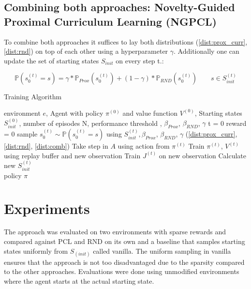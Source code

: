 \documentclass{article}
\begin{document}
\subsection{Combining both approaches: Novelty-Guided Proximal Curriculum Learning (NGPCL)}
\label{sec:comb}

To combine both approaches it suffices to lay both distributions (\cref{dist:prox_curr}, \cref{dist:rnd}) on top of each other using a hyperparameter $\gamma$. Additionally one can update the set of starting states $S_{init}$ on every step t.:

\begin{equation}\label{dist:comb}
  \mathbb{P}(s_0^{(t)} = s) = \gamma * \mathbb{P}_{Prox}(s_0^{(t)}) + (1 - \gamma) * \mathbb{P}_{RND}(s_0^{(t)}) \qquad s \in S_{init}^{(t)}
\end{equation}

\begin{algorithm}[H]
    \caption{Training Algorithm}
    \label{alg:code}
    \begin{algorithmic}
      \Require environment $e$, Agent with policy $\pi^{(0)}$ and value function $V^{(0)}$, Starting states $S_{init}^{(0)}$, number of episodes N, performance threshold \eta, $\beta_{Prox}$, $\beta_{RND}$, $\gamma$
        \State t = 0
        \State reward = 0
        \State sample $s_0^{(t)} \sim \mathbb{P}(s_0^{(t)} = s)$ using $S_{init}^{(t)}, \beta_{Prox}$, $\beta_{RND}$, $\gamma$ (\cref{dist:prox_curr}, \cref{dist:rnd}, \cref{dist:comb})
          \State Take step in $A$ using action from $\pi^{(t)}$
          \State Train $\pi^{(t)}$, $V^{(t)}$ using replay buffer and new observation
          \State Train $J^{(t)}$ on new observation
          \State Calculate new $S_{init}^{(t)}$
        \EndWhile \\
        \Return policy $\pi$
    \end{algorithmic}
\end{algorithm}


\section{Experiments}
\label{sec:experiments}
The approach was evaluated on two environments with sparse rewards and compared against PCL and RND on its own and a baseline that samples starting states uniformly from $S_{(init)}$ called vanilla. The uniform sampling in vanilla ensures that the approach is not too disadvantaged due to the sparsity compared to the other approaches. Evaluations were done using unmodified environments where the agent starts at the actual starting state.
\end{document}
